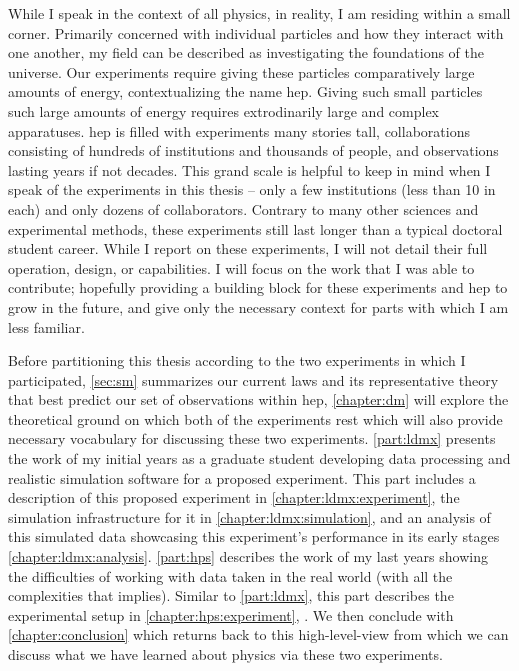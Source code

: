 While I speak in the context of all physics, in reality, I am residing within a small corner.
Primarily concerned with individual particles and how they interact with one another, my field can
be described as investigating the foundations of the universe. Our experiments require giving these
particles comparatively large amounts of energy, contextualizing the name \ac{hep}. Giving
such small particles such large amounts of energy requires extrodinarily large and complex
apparatuses. \ac{hep} is filled with experiments many stories tall, collaborations consisting of
hundreds of institutions and thousands of people, and observations lasting years if not decades.
This grand scale is helpful to keep in mind when I speak of the experiments in this thesis -- only
a few institutions (less than 10 in each) and only dozens of collaborators. Contrary to many other
sciences and experimental methods, these experiments still last longer than a typical doctoral
student career. While I report on these experiments, I will not detail their full operation,
design, or capabilities. I will focus on the work that I was able to contribute; hopefully
providing a building block for these experiments and \ac{hep} to grow in the future, and give only
the necessary context for parts with which I am less familiar.

Before partitioning this thesis according to the two experiments in which I participated,
\cref{sec:sm} summarizes our current laws and its representative theory that best predict our set
of observations within \ac{hep}, \cref{chapter:dm} will explore the theoretical ground on which
both of the experiments rest which will also provide necessary vocabulary for discussing these two
experiments. \cref{part:ldmx} presents the work of my initial years as a graduate student
developing data processing and realistic simulation software for a proposed experiment. This part
includes a description of this proposed experiment in \cref{chapter:ldmx:experiment}, the
simulation infrastructure for it in \cref{chapter:ldmx:simulation}, and an analysis of this
simulated data showcasing this experiment's performance in its early stages
\cref{chapter:ldmx:analysis}. \cref{part:hps} describes the work of my last years showing the
difficulties of working with data taken in the real world (with all the complexities that implies).
Similar to \cref{part:ldmx}, this part describes the experimental setup in
\cref{chapter:hps:experiment}, . We then conclude with
\cref{chapter:conclusion} which returns back to this high-level-view from which we can discuss what
we have learned about physics via these two experiments.

